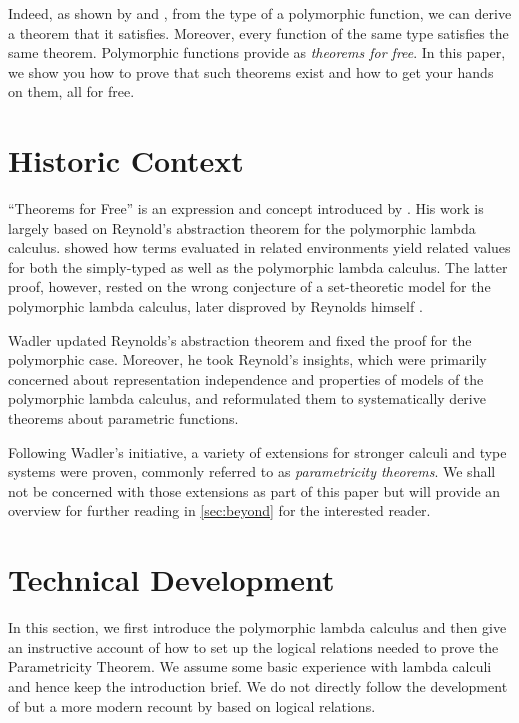 \documentclass[12pt]{article}
\theoremstyle{plain}
\theoremstyle{definition}
\begin{document}
Indeed, as shown by \citet{Reynolds1983TypesAA} and \citet{wadler1989theorems}, from the type of a polymorphic function,
we can derive a theorem that it satisfies.
Moreover, every function of the same type satisfies the same theorem.
Polymorphic functions provide as \emph{theorems for free}.
In this paper, we show you how to prove that such theorems exist and how to get your hands on them, all for free.

\section{Historic Context}

``Theorems for Free'' is an expression and concept introduced by \citet{wadler1989theorems}.
His work is largely based on Reynold's abstraction theorem for the polymorphic lambda calculus.
\citet{Reynolds1983TypesAA} showed how terms evaluated in related environments yield related values for both the simply-typed as well as the polymorphic lambda calculus.
The latter proof, however, rested on the wrong conjecture of a set-theoretic model for the polymorphic lambda calculus, later disproved by Reynolds himself \citep{polymorphismnotset}.

Wadler updated Reynolds's abstraction theorem and fixed the proof for the polymorphic case.
Moreover, he took Reynold's insights,
which were primarily concerned about representation independence and properties of models of the polymorphic lambda calculus,
and reformulated them to systematically derive theorems about parametric functions.

Following Wadler's initiative, a variety of
extensions for stronger calculi and type systems were proven,
commonly referred to as \emph{parametricity theorems}.
We shall not be concerned with those extensions as part of this paper but will
provide an overview for further reading in \cref{sec:beyond} for the interested reader.

\section{Technical Development}

In this section, we first introduce the polymorphic lambda calculus and then give an instructive account of how to set up the logical relations needed to prove the Parametricity Theorem.
We assume some basic experience with lambda calculi and hence keep the introduction brief.
We do not directly follow the development of \citet{wadler1989theorems}
but a more modern recount by \citet{skorstengaard2019introduction} based on logical relations.
\end{document}
